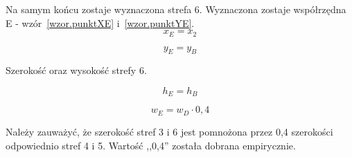 \documentclass[a4paper,twoside,12pt]{book}
\begin{document}
    Na samym końcu zostaje wyznaczona strefa 6.
    Wyznaczona zostaje współrzędna E - wzór~\ref{wzor.punktXE} i~\ref{wzor.punktYE}.
    \large
    \begin{equation}
        x_{E}=x_{2}
        \label{wzor.punktXE}
    \end{equation}
    \normalsize

    \large
    \begin{equation}
        y_{E}= y_{B}
        \label{wzor.punktYE}
    \end{equation}
    \normalsize

    Szerokość oraz wysokość strefy 6.

    \large
    \begin{equation}
        h_{E}=h_{B}
        \label{wzor.punktHE}
    \end{equation}
    \normalsize

    \large
    \begin{equation}
        w_{E}= w_{D} \cdot 0,4
        \label{wzor.punktWE}
    \end{equation}
    \normalsize

    Należy zauważyć, że szerokość stref 3 i 6 jest pomnożona przez 0,4 szerokości odpowiednio
    stref 4 i 5.
    Wartość ,,0,4'' została dobrana empirycznie.
\end{document}
